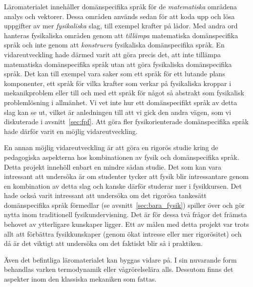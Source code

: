 Läromaterialet innehåller domänspecifika språk för de \textit{matematiska}
områdena analys och vektorer. Dessa områden används sedan för att koda upp och
lösa uppgifter av mer \textit{fysikaliska} slag, till exempel krafter på lådor. Med andra ord hanteras fysikaliska områden genom att \textit{tillämpa} matematiska domänspecifika språk och inte genom att \textit{konstruera} fysikaliska domänspecifika språk. En vidareutveckling
hade därmed varit att göra precis det, att inte tillämpa matematiska
domänspecifika språk utan att göra fysikaliska domänspecifika språk. Det kan till exempel vara
saker som ett språk för ett lutande plans komponenter, ett språk för vilka krafter som verkar på fysikaliska kroppar i mekanikproblem eller till och med ett språk för något så abstrakt som
fysikalisk problemlösning i allmänhet. Vi vet inte hur ett domänspecifikt språk
av detta slag kan se ut, vilket är anledningen till att vi gick den andra vägen,
som vi diskuterade i avsnitt~\ref{sec:fpf}. Att göra fler fysikorienterade
domänspecifika språk hade därför varit en möjlig vidareutveckling.

En annan möjlig vidareutveckling är att göra en rigorös studie kring de
pedagogiska aspekterna hos kombinationen av fysik och domänspecifika språk.
Detta projekt innehöll enbart en mindre sådan studie. Det som kan vara
intressant att undersöka är om studenter tycker att fysik blir intressantare
genom en kombination av detta slag och kanske därför studerar mer i fysikkursen.
Det hade också varit intressant att undersöka om det rigorösa tankesätt
domänspecifika språk förmedlar (se avsnitt~\ref{sec:bara_fysik}) spiller över och
gör nytta inom traditionell fysikundervisning. Det är för dessa två frågor det
främsta behovet av ytterligare kunskaper ligger. Ett av målen med detta projekt var trots allt att förbättra fysikkunskaper (genom ökat intresse eller mer
rigorösitet) och då är det viktigt att undersöka om det faktiskt blir
så i praktiken.

Även det befintliga läromaterialet kan byggas vidare på. I sin nuvarande
form behandlas varken termodynamik eller vågrörelselära alls. Dessutom
finns det aspekter inom den klassiska mekaniken som fattas.

